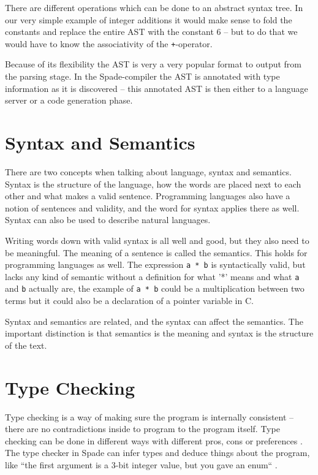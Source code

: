 There are different operations which can be done to an abstract syntax tree. In our very simple example of integer additions it would make sense to fold the constants and replace the entire AST with the constant 6 -- but to do that we would have to know the associativity of the \verb!+!-operator.

Because of its flexibility the AST is very a very popular format to output from the parsing stage. In the Spade-compiler the AST is annotated with type information as it is discovered -- this annotated AST is then either to a language server or a code generation phase.

\section{Syntax and Semantics}
There are two concepts when talking about language, syntax and semantics. Syntax is the structure of the language, how the words are placed next to each other and what makes a valid sentence. Programming languages also have a notion of sentences and validity, and the word for syntax applies there as well. Syntax can also be used to describe natural languages.

Writing words down with valid syntax is all well and good, but they also need to be meaningful. The meaning of a sentence is called the semantics. This holds for programming languages as well. The expression \verb+a * b+ is syntactically valid, but lacks any kind of semantic without a definition for what '*' means and what \verb+a+ and \verb+b+ actually are, the example of \verb+a * b+ could be a multiplication between two terms but it could also be a declaration of a pointer variable in C.

Syntax and semantics are related, and the syntax can affect the semantics. The important distinction is that semantics is the meaning and syntax is the structure of the text.

\section{Type Checking} %
\label{sec:TypeChecking}
Type checking is a way of making sure the program is internally consistent -- there are no contradictions inside to program to the program itself. Type checking can be done in different ways with different pros, cons or preferences \cite{src:TypeCheckersBook}. The type checker in Spade can infer types and deduce things about the program, like ``the first argument is a 3-bit integer value, but you gave an enum`` \cite{src:spadeAnHDL}.

